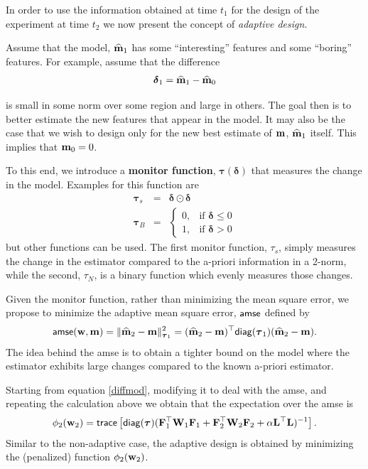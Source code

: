 \documentclass[11pt]{article}
\newcommand{\bfF}	{{\bf{F}}}
\newcommand{\bfL}	{{\bf{L}}}
\newcommand{\bfW}	{{\bf{W}}}
\newcommand{\bfm}	{{\bf{m}}}
\newcommand{\bfw}	{{\bf{w}}}
\newcommand{\bftau}      {{\boldsymbol \tau}}
\newcommand{\bfdelta}	 { { \boldsymbol \delta} }
\newcommand{\LtL}       { \bfL^{\top}\bfL}
\newcommand{\bfmhat}    {{\widehat{\bfm}}}
\begin{document}
In order to use the information obtained at time $t_{1}$ for the design of the experiment at time $t_{2}$
 we now present the concept of {\em adaptive design}.

 Assume that the model, $\bfmhat_{1}$ has some ``interesting'' features and some ``boring'' features.
For example, assume that the difference
\begin{eqnarray*}
\label{diff}
 \bfdelta_{1} = \bfmhat_{1} - \bfmhat_{0}
\end{eqnarray*}


is small in some norm over some region and large in others. The goal then is to better estimate the new features
that appear in the model. It may also be the case that we wish to design only for the new best estimate of $\bfm$, $\bfmhat_1$ itself. This implies that $\bfm_0=0$. 

To this end, we introduce a {\bf monitor function}, $\bftau(\bfdelta)$ that measures
the change in the model. 
Examples for this function are
\begin{subequations}
\label{taufuns}
\begin{eqnarray*}
\bftau_{s} &=& \bfdelta \odot \bfdelta \\
\bftau_{B} &=& 
\begin{cases}
0, & \text{if } \bfdelta \leq 0\\
1, & \text{if } \bfdelta > 0
\end{cases}
\end{eqnarray*}
\end{subequations}
but other functions can be used. The first monitor  function, $\tau_{s}$, simply measures the change in the estimator
compared to the a-priori information in a 2-norm, while the second, $\tau_{N}$, is a binary function which evenly measures those changes. 

Given the monitor function,
rather than minimizing the mean square error, we propose to minimize the
adaptive mean square error, ${\sf amse}$ defined by
\begin{eqnarray}
\label{amse}
{\sf amse}(\bfw,\bfm) = \| \bfmhat_2 -\bfm \|_{\bftau_1}^{2} = 
 (\bfmhat_2 -\bfm)^{\top}{\sf diag}(\bftau_1)(\bfmhat_2 -\bfm).
 \end{eqnarray}
The idea behind the {\sf amse} is to obtain a tighter bound on the model where the estimator exhibits large changes
compared to the known a-priori estimator. 

Starting from  equation \eqref{diffmod}, modifying it to deal with the {\sf amse}, and repeating the calculation above we obtain that the expectation 
over the {\sf amse} is
\begin{eqnarray}
\label{design2ad}
\phi_{2}(\bfw_{2}) =  {\sf trace} \left[  {\sf diag}(\bftau) (\bfF_{1}^{\top}\bfW_{1}\bfF_{1}   + \bfF_{2}^{\top}\bfW_{2}\bfF_{2} +
\alpha \LtL)^{-1} \right]. 
\end{eqnarray}
Similar to the non-adaptive case, the adaptive design is obtained by minimizing the (penalized) 
function $\phi_{2}(\bfw_{2})$.
\end{document}

